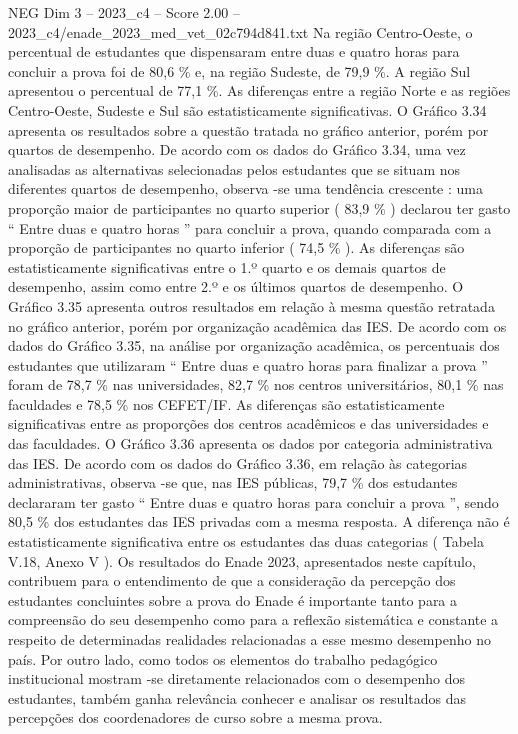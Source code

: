 \begin{textsample}{NEG Dim 3 – 2023\_c4 – Score 2.00 – 2023\_c4/enade\_2023\_med\_vet\_02c794d841.txt}
Na região Centro-Oeste, o percentual de estudantes que dispensaram entre duas e quatro horas para concluir a prova foi de 80,6 \% e, na região Sudeste, de 79,9 \%.
A região Sul apresentou o percentual de 77,1 \%.
As diferenças entre a região Norte e as regiões Centro-Oeste, Sudeste e Sul são estatisticamente significativas.
O Gráfico 3.34 apresenta os resultados sobre a questão tratada no gráfico anterior, porém por quartos de desempenho.
De acordo com os dados do Gráfico 3.34, uma vez analisadas as alternativas selecionadas pelos estudantes que se situam nos diferentes quartos de desempenho, observa -se uma tendência crescente : uma proporção maior de participantes no quarto superior ( 83,9 \% ) declarou ter gasto “ Entre duas e quatro horas ” para concluir a prova, quando comparada com a proporção de participantes no quarto inferior ( 74,5 \% ).
As diferenças são estatisticamente significativas entre o 1.º quarto e os demais quartos de desempenho, assim como entre 2.º e os últimos quartos de desempenho.
O Gráfico 3.35 apresenta outros resultados em relação à mesma questão retratada no gráfico anterior, porém por organização acadêmica das IES.
De acordo com os dados do Gráfico 3.35, na análise por organização acadêmica, os percentuais dos estudantes que utilizaram “ Entre duas e quatro horas para finalizar a prova ” foram de 78,7 \% nas universidades, 82,7 \% nos centros universitários, 80,1 \% nas faculdades e 78,5 \% nos CEFET/IF.
As diferenças são estatisticamente significativas entre as proporções dos centros acadêmicos e das universidades e das faculdades.
O Gráfico 3.36 apresenta os dados por categoria administrativa das IES.
De acordo com os dados do Gráfico 3.36, em relação às categorias administrativas, observa -se que, nas IES públicas, 79,7 \% dos estudantes declararam ter gasto “ Entre duas e quatro horas para concluir a prova ”, sendo 80,5 \% dos estudantes das IES privadas com a mesma resposta.
A diferença não é estatisticamente significativa entre os estudantes das duas categorias ( Tabela V.18, Anexo V ).
Os resultados do Enade 2023, apresentados neste capítulo, contribuem para o entendimento de que a consideração da percepção dos estudantes concluintes sobre a prova do Enade é importante tanto para a compreensão do seu desempenho como para a reflexão sistemática e constante a respeito de determinadas realidades relacionadas a esse mesmo desempenho no país.
Por outro lado, como todos os elementos do trabalho pedagógico institucional mostram -se diretamente relacionados com o desempenho dos estudantes, também ganha relevância conhecer e analisar os resultados das percepções dos coordenadores de curso sobre a mesma prova.

\end{textsample}

